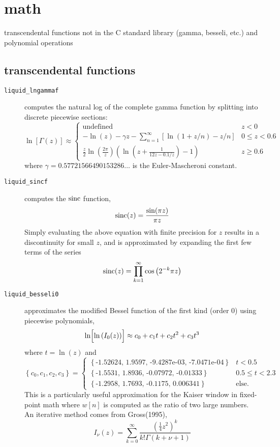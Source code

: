% 
%

\newpage
\section{math}
\label{module:math}
transcendental functions not in the C standard library (gamma, besseli, etc.)
and polynomial operations

\subsection{transcendental functions}
\label{module:math:transcendentals}

\begin{description}
\item[{\tt liquid\_lngammaf}]
    computes the natural log of the complete gamma function by splitting into
    discrete piecewise sections:
\[
    \ln\left[ \Gamma(z) \right] \approx
    \begin{cases}
        \text{undefined}
        & z < 0 \\
        -\ln(z) - \gamma z - \sum_{n=1}^{\infty} {
            \left[ \ln(1 + z/n) -z/n\right]
        }
        & 0 \le z < 0.6 \\
        \frac{z}{2} \ln\left( \frac{2\pi}{z} \right)
        \left(
            \ln\left(z + \frac{1}{12 z - 0.1/z} \right) - 1
        \right)
        & z \ge 0.6
    \end{cases}
\]
where $\gamma=0.57721566490153286\ldots$ is the Euler-Mascheroni constant.

\item[{\tt liquid\_sincf}]
    computes the $\textup{sinc}$ function,
\[
    \textup{sinc}(z) = \frac{\sin(\pi z)}{\pi z}
\]
Simply evaluating the above equation with finite precision for $z$ results in
a discontinuity for small $z$, and is approximated by expanding the first few
terms of the series
\[
    \textup{sinc}(z) = \prod_{k=1}^{\infty}{ \cos\left( 2^{-k} \pi z \right) }
\]

\item[{\tt liquid\_besseli0}]
    approximates the modified Bessel function of the first kind (order 0)
    using piecewise polynomials,
\[
    \ln\Bigl[\ln\left(I_0(z)\right)\Bigr] \approx
    c_0 + c_1 t + c_2 t ^2 + c_3 t^3
\]
where $t=\ln(z)$ and
\[
    \left\{c_0,c_1,c_2,c_3\right\} =
    \begin{cases}
    \left\{\text{-1.52624, 1.9597, -9.4287e-03, -7.0471e-04}\right\} & t < 0.5 \\
    \left\{\text{-1.5531, 1.8936, -0.07972, -0.01333}\right\} & 0.5 \le t < 2.3 \\
    \left\{\text{-1.2958, 1.7693, -0.1175, 0.006341}\right\} & \text{else}.
    \end{cases}
\]
This is a particularly useful approximation for the Kaiser window in
fixed-point math where $w[n]$ is computed as the ratio of two large numbers.
%
An iterative method comes from Gross(1995),
\[
    I_\nu(z) = \sum_{k=0}^{\infty}{\frac{\left(\frac{1}{4}z^2\right)^k}{k!\Gamma(k+\nu+1)}}
\]


\end{description}

